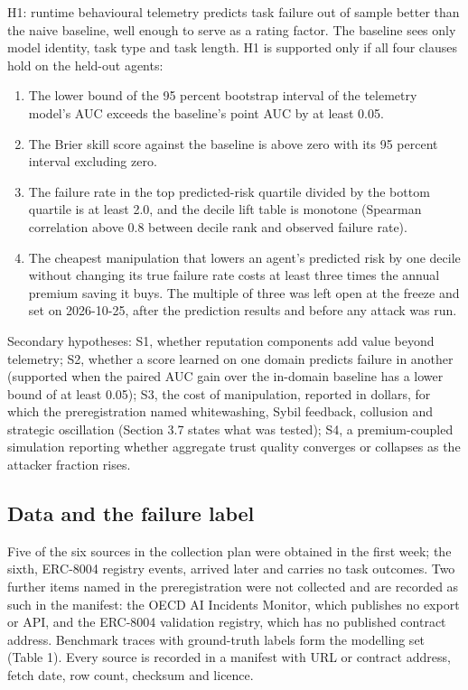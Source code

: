 \documentclass[
  11pt,
  a4paper,
]{article}
\providecommand{\tightlist}{%
  \setlength{\itemsep}{0pt}\setlength{\parskip}{0pt}}
\begin{document}
H1: runtime behavioural telemetry predicts task failure out of sample
better than the naive baseline, well enough to serve as a rating factor.
The baseline sees only model identity, task type and task length. H1 is
supported only if all four clauses hold on the held-out agents:

\begin{enumerate}
\def\labelenumi{\arabic{enumi}.}
\tightlist
\item
  The lower bound of the 95 percent bootstrap interval of the telemetry
  model's AUC exceeds the baseline's point AUC by at least 0.05.
\item
  The Brier skill score against the baseline is above zero with its 95
  percent interval excluding zero.
\item
  The failure rate in the top predicted-risk quartile divided by the
  bottom quartile is at least 2.0, and the decile lift table is monotone
  (Spearman correlation above 0.8 between decile rank and observed
  failure rate).
\item
  The cheapest manipulation that lowers an agent's predicted risk by one
  decile without changing its true failure rate costs at least three
  times the annual premium saving it buys. The multiple of three was
  left open at the freeze and set on 2026-10-25, after the prediction
  results and before any attack was run.
\end{enumerate}

Secondary hypotheses: S1, whether reputation components add value beyond
telemetry; S2, whether a score learned on one domain predicts failure in
another (supported when the paired AUC gain over the in-domain baseline
has a lower bound of at least 0.05); S3, the cost of manipulation,
reported in dollars, for which the preregistration named whitewashing,
Sybil feedback, collusion and strategic oscillation (Section 3.7 states
what was tested); S4, a premium-coupled simulation reporting whether
aggregate trust quality converges or collapses as the attacker fraction
rises.

\hypertarget{data-and-the-failure-label}{%
\subsection{Data and the failure
label}\label{data-and-the-failure-label}}

Five of the six sources in the collection plan were obtained in the
first week; the sixth, ERC-8004 registry events, arrived later and
carries no task outcomes. Two further items named in the preregistration
were not collected and are recorded as such in the manifest: the OECD AI
Incidents Monitor, which publishes no export or API, and the ERC-8004
validation registry, which has no published contract address. Benchmark
traces with ground-truth labels form the modelling set (Table 1). Every
source is recorded in a manifest with URL or contract address, fetch
date, row count, checksum and licence.
\end{document}
